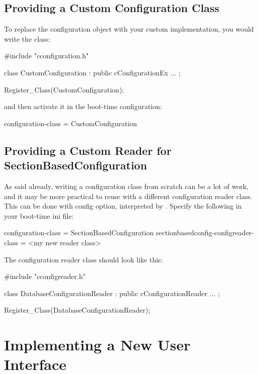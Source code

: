 \subsection{Providing a Custom Configuration Class}

To replace the configuration object with your custom implementation,
you would write the class:

\begin{cpp}
#include "cconfiguration.h"

class CustomConfiguration : public cConfigurationEx
{
   ...
};

Register_Class(CustomConfiguration);
\end{cpp}

and then activate it in the boot-time configuration:

\begin{inifile}
[General]
configuration-class = CustomConfiguration
\end{inifile}


\subsection{Providing a Custom Reader for SectionBasedConfiguration}

As said already, writing a configuration class from scratch can
be a lot of work, and it may be more practical to reuse
 with a different configuration
reader class. This can be done with 
config option, interpreted by .
Specify the following in your boot-time ini file:

\begin{inifile}
[General]
configuration-class = SectionBasedConfiguration
sectionbasedconfig-configreader-class = <my new reader class>
\end{inifile}

The configuration reader class should look like this:

\begin{cpp}
#include "cconfigreader.h"

class DatabaseConfigurationReader : public cConfigurationReader
{
   ...
};

Register_Class(DatabaseConfigurationReader);
\end{cpp}


\section{Implementing a New User Interface}
\label{sec:plugin-exts:userinterface}

